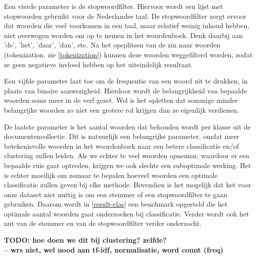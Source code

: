 Een vierde parameter is de stopwoordfilter. Hiervoor wordt een lijst met stopwoorden gebruikt voor de Nederlandse taal. De stopwoordfilter zorgt ervoor dat woorden die veel voorkomen in een taal, maar relatief weinig inhoud hebben, niet overwogen worden om op te nemen in het woordenboek. Denk daarbij aan 'de', 'het', 'daar', 'dan', etc. Na het opsplitsen van de zin naar woorden (tokenization, zie \ref{tokenization}) kunnen deze woorden weggefilterd worden, zodat ze geen negatieve invloed hebben op het uiteindelijk resultaat.

Een vijfde parameter laat toe om de frequentie van een woord uit te drukken, in plaats van binaire aanwezigheid. Hierdoor wordt de belangrijkheid van bepaalde woorden soms meer in de verf gezet. Wel is het opletten dat sommige minder belangrijke woorden zo niet een grotere rol krijgen dan ze eigenlijk verdienen.

De laatste parameter is het aantal woorden dat behouden wordt per klasse uit de documentencollectie. Dit is natuurlijk een belangrijke parameter, omdat meer betekenisvolle woorden in het woordenboek naar een betere classificatie en/of clustering zullen leiden. Als we echter te veel woorden opnemen, waardoor er een bepaalde ruis gaat optreden, krijgen we ook slechts een suboptimale werking. Het is echter moeilijk om zomaar te bepalen hoeveel woorden een optimale classificatie zullen geven bij elke methode. Bovendien is het mogelijk dat het voor onze dataset niet nuttig is om een stemmer of een stopwoordfilter te gaan gebruiken. Daarom wordt in \ref{result-clas} een benchmark opgesteld die het optimale aantal woorden gaat onderzoeken bij classificatie. Verder wordt ook het  nut van de stemmer en van de stopwoordfilter verder onderzocht. 

\textbf{TODO: hoe doen we dit bij clustering? zelfde?\\-- wrs niet, wel nood aan tf-idf, normalisatie, word count (freq)}
\fi


